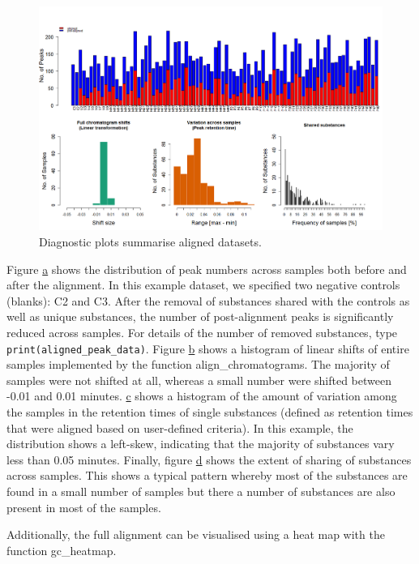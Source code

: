 \begin{figure}[htbp]
\centering
\includegraphics[width=15cm]{figures/plot_aligned_peak_data}
\caption{Diagnostic plots summarise aligned datasets.}
\label{figure:plot}
\end{figure}

Figure \href{figure:plot} a shows the distribution of peak numbers
across samples both before and after the alignment. In this example
dataset, we specified two negative controls (blanks): C2 and C3. After
the removal of substances shared with the controls as well as unique
substances, the number of post-alignment peaks is significantly reduced
across samples. For details of the number of removed substances, type
\texttt{print(aligned\_peak\_data)}. Figure \href{figure:plot} b shows a
histogram of linear shifts of entire samples implemented by the function
align\_chromatograms. The majority of samples were not shifted at all,
whereas a small number were shifted between -0.01 and 0.01 minutes.
\href{figure:plot} c shows a histogram of the amount of variation among
the samples in the retention times of single substances (defined as
retention times that were aligned based on user-defined criteria). In
this example, the distribution shows a left-skew, indicating that the
majority of substances vary less than 0.05 minutes. Finally, figure
\href{figure:plot} d shows the extent of sharing of substances across
samples. This shows a typical pattern whereby most of the substances are
found in a small number of samples but there a number of substances are
also present in most of the samples.

Additionally, the full alignment can be visualised using a heat map with
the function gc\_heatmap.

